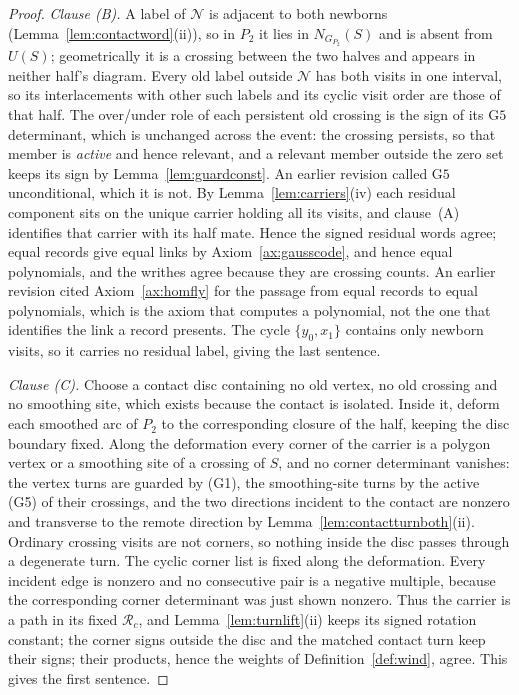 \begin{proof}
\emph{Clause (B).}
A label of $\mathcal N$ is adjacent to both newborns
(Lemma~\ref{lem:contactword}(ii)), so in $P_2$ it lies in
$N_{G_{P_2}}(S)$ and is absent from $U(S)$; geometrically it is a crossing between
the two halves and appears in neither half's diagram. Every old label outside
$\mathcal N$ has both visits in one interval, so its interlacements with other
such labels and its cyclic visit order are those of that half. The over/under
role of each persistent old crossing is the sign of its $\mathrm{G5}$
determinant, which is unchanged across the event: the crossing persists, so that
member is \emph{active} and hence relevant, and a relevant member outside the
zero set keeps its sign by Lemma~\ref{lem:guardconst}. An earlier revision
called $\mathrm{G5}$ unconditional, which it is not. By Lemma~\ref{lem:carriers}(iv) each
residual component sits on the unique carrier holding all its visits, and
clause~(A) identifies that carrier with its half mate. Hence the signed residual words agree; equal records give equal links by
Axiom~\ref{ax:gausscode}, and hence equal polynomials, and the writhes agree
because they are crossing counts. An earlier revision cited
Axiom~\ref{ax:homfly} for the passage from equal records to equal polynomials,
which is the axiom that computes a polynomial, not the one that identifies the
link a record presents. The cycle
$\{y_0,x_1\}$ contains only newborn visits, so it carries no residual label,
giving the last sentence.


\emph{Clause (C).}
Choose a contact disc containing no old vertex, no old crossing and no
smoothing site, which exists because the contact is isolated. Inside it, deform
each smoothed arc of $P_2$ to the corresponding closure of the half, keeping
the disc boundary fixed. Along the deformation every corner of the carrier is a
polygon vertex or a smoothing site of a crossing of $S$, and no corner
determinant vanishes: the vertex turns are guarded by (G1), the smoothing-site
turns by the active (G5) of their crossings, and the two directions incident to
the contact are nonzero and transverse to the remote direction by
Lemma~\ref{lem:contactturnboth}(ii). Ordinary crossing visits are not corners, so
nothing inside the disc passes through a degenerate turn. The cyclic corner list is fixed along the deformation. Every incident
edge is nonzero and no consecutive pair is a negative multiple, because the
corresponding corner determinant was just shown nonzero. Thus the carrier is a
path in its fixed $\mathcal R_c$, and Lemma~\ref{lem:turnlift}(ii) keeps its
signed rotation constant; the corner signs outside the disc and the matched contact turn keep their signs;
their products, hence the weights of Definition~\ref{def:wind}, agree. This gives the first sentence.


\end{proof}
